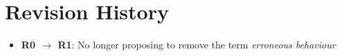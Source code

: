 
\section*{Revision History}
\begin{itemize}
\item \textbf{R0 $\rightarrow$ R1}: No longer proposing to remove the term \emph{erroneous behaviour}
\end{itemize}


\renewcommand{\addcontentsline}[3]{}%








